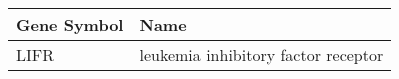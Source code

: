 \begin{tabular}{ll}
\toprule
Gene Symbol &                                Name \\
\midrule
       LIFR & leukemia inhibitory factor receptor \\
\bottomrule
\end{tabular}

